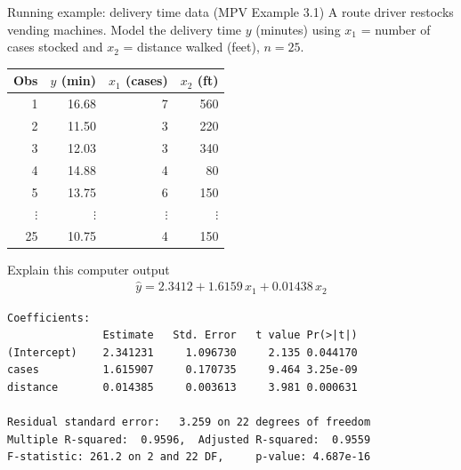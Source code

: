

\begin{frame}{Running example: delivery time data (MPV Example 3.1)}
    A route driver restocks vending machines. Model the delivery time $y$ (minutes) using $x_1$ = number of cases stocked and $x_2$ = distance walked (feet), $n=25$.

    \begin{center}
        \small
        \begin{tabular}{rrrr}
            \toprule
            Obs & $y$ (min) & $x_1$ (cases) & $x_2$ (ft) \\
            \midrule
            1 & 16.68 & 7 & 560 \\
            2 & 11.50 & 3 & 220 \\
            3 & 12.03 & 3 & 340 \\
            4 & 14.88 & 4 & 80 \\
            5 & 13.75 & 6 & 150 \\
            $\vdots$ & $\vdots$ & $\vdots$ & $\vdots$ \\
            25 & 10.75 & 4 & 150 \\
            \bottomrule
        \end{tabular}
    \end{center}
\end{frame}


\begin{frame}[fragile]{Explain this computer output}
    \begin{align*}
        \hat y = 2.3412 + 1.6159\,x_1 + 0.01438\,x_2
    \end{align*}
    \begin{verbatim}
Coefficients:
               Estimate   Std. Error   t value Pr(>|t|)
(Intercept)    2.341231     1.096730     2.135 0.044170
cases          1.615907     0.170735     9.464 3.25e-09
distance       0.014385     0.003613     3.981 0.000631

Residual standard error:   3.259 on 22 degrees of freedom
Multiple R-squared:  0.9596,  Adjusted R-squared:  0.9559
F-statistic: 261.2 on 2 and 22 DF,     p-value: 4.687e-16
    \end{verbatim}
\end{frame}



